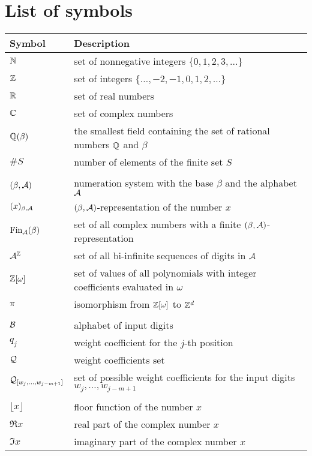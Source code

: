 \chapter*{List of symbols}
\begin{tabular}{ll}
Symbol        & Description \\ \hline
$\mathbb{N}$         & set of nonnegative integers $\{0,1,2,3,\dots\}$   \\
$\mathbb{Z}$         & set of integers $\{\dots,-2,-1,0,1,2,\dots\}$ \\
$\mathbb{R}$           & set of real numbers \\
$\mathbb{C}$           & set of complex numbers \\
$\mathbb{Q}(\beta)$    &the smallest field containing the set of rational numbers $\mathbb{Q}$ and $\beta$ \\
$\#S$          & number of elements of the finite set $S$ \\
\rule{0cm}{0cm}& \\
$(\beta,\mathcal{A})$            & numeration system with the base $\beta$ and the alphabet $\mathcal{A}$\\
$(x)_{\beta,\mathcal{A}}$    &$(\beta,\mathcal{A})$-representation of the number $x$\\
$\text{Fin}_{\mathcal{A}}(\beta)$          &set of all complex numbers with a finite $(\beta,\mathcal{A})$-representation \\
$\mathcal{A}^{\mathbb{Z}}$        &set of all bi-infinite sequences of digits in $\mathcal{A}$\\
$\mathbb{Z}[\omega]$       &set of values of all polynomials with integer coefficients evaluated in $\omega$\\
$\pi$           &isomorphism from $\mathbb{Z}[\omega]$ to $\mathbb{Z}^d$ \\
\rule{0cm}{0cm}& \\
$\mathcal{B}$            &alphabet of input digits\\
$q_j$           &weight coefficient for the $j$-th position \\
$\mathcal{Q}$            &weight coefficients set\\
$\mathcal{Q}_{[w_{j},\dots, w_{j-m+1}]}$ &set of possible weight coefficients for the input digits $w_{j},\dots, w_{j-m+1}$ \\
\rule{0cm}{0cm}& \\
$\lfloor x \rfloor$ & floor function of the number $x$ \\  
$\Re x$           & real part of the complex number $x$ \\
$\Im x$           & imaginary part of the complex number $x$
\end{tabular}